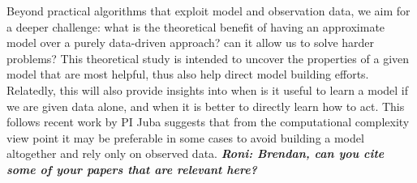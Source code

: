 \documentclass[12pt]{article}
\newcommand{\note}[1]{\textbf{\textit{#1}}}
\begin{document}
Beyond practical algorithms that exploit model and observation data, we aim for a deeper challenge: what is the theoretical benefit of having an approximate model over a purely data-driven approach? can it allow us to solve harder problems? 
This theoretical study is intended to uncover the properties of a given model that are most helpful, thus also help direct model building efforts. Relatedly, this will also provide insights into when is it useful to learn a model if we are given data alone, and when it is better to directly learn how to act. 
This follows recent work by PI Juba suggests that from the computational complexity view point it may be preferable in some cases to avoid building a model altogether and rely only on observed data.  \note{Roni: Brendan, can you cite some of your papers that are relevant here?}
\end{document}
